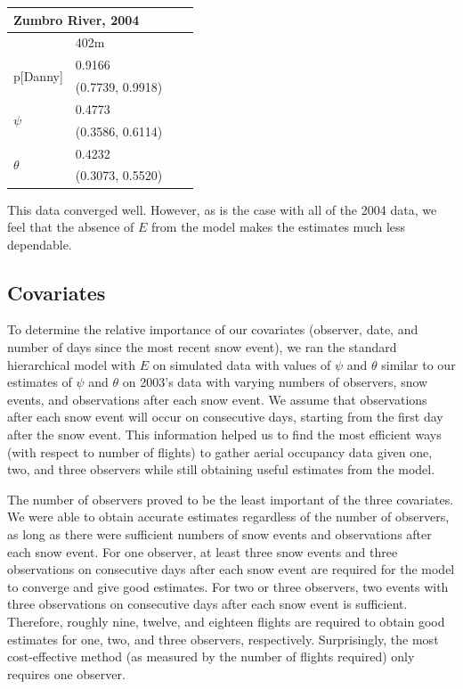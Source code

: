 \documentclass[12pt]{article}
\begin{document}
    \begin{center}
    \begin{tabular}{|l|l|l|l|}
        \hline
        \multicolumn{2}{|l|}{\textbf{Zumbro River, 2004}} \\
        \hline
            & 402m \\
        \hline
        \multirow{2}{*}{p[Danny]}
            & 0.9166 \\
            & (0.7739, 0.9918) \\
        \hline
        \multirow{2}{*}{\(\psi\)}
            & 0.4773 \\
            & (0.3586, 0.6114) \\
        \hline
        \multirow{2}{*}{\(\theta\)}
            & 0.4232 \\
            & (0.3073, 0.5520) \\
        \hline
    \end{tabular}
    \end{center}

    This data converged well. However, as is the case with all of the 2004 data,
    we feel that the absence of \(E\) from the model makes the estimates much
    less dependable.

    \subsection{Covariates}
    To determine the relative importance of our covariates (observer, date, and
    number of days since the most recent snow event), we ran the standard
    hierarchical model with \(E\) on simulated data with values of \(\psi\) and
    \(\theta\) similar to our estimates of \(\psi\) and \(\theta\) on 2003's
    data with varying numbers of observers, snow events, and observations after
    each snow event. We assume that observations after each snow event will
    occur on consecutive days, starting from the first day after the snow event.
    This information helped us to find the most efficient ways (with respect to
    number of flights) to gather aerial occupancy data given one, two, and three
    observers while still obtaining useful estimates from the model.

    The number of observers proved to be the least important of the three
    covariates. We were able to obtain accurate estimates regardless of the
    number of observers, as long as there were sufficient numbers of snow events
    and observations after each snow event. For one observer, at least three
    snow events and three observations on consecutive days after each snow event
    are required for the model to converge and give good estimates. For two or
    three observers, two events with three observations on consecutive days
    after each snow event is sufficient. Therefore, roughly nine, twelve, and
    eighteen flights are required to obtain good estimates for one, two, and
    three observers, respectively. Surprisingly, the most cost-effective method
    (as measured by the number of flights required) only requires one observer.
\end{document}
